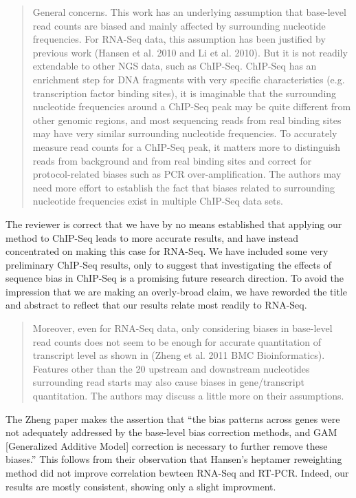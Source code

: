 \documentclass{article}
\begin{document}
\begin{quote}
General concerns. This work has an underlying assumption that base-level read
counts are biased and mainly affected by surrounding nucleotide frequencies.
For RNA-Seq data, this assumption has been justified by previous work (Hansen et
al. 2010 and Li et al. 2010). But it is not readily extendable to other NGS
data, such as ChIP-Seq. ChIP-Seq has an enrichment step for DNA fragments with
very specific characteristics (e.g. transcription factor binding sites), it is
imaginable that the surrounding nucleotide frequencies around a ChIP-Seq peak
may be quite different from other genomic regions, and most sequencing reads
from real binding sites may have very similar surrounding nucleotide
frequencies. To accurately measure read counts for a ChIP-Seq peak, it matters
more to distinguish reads from background and from real binding sites and
correct for protocol-related biases such as PCR over-amplification. The authors
may need more effort to establish the fact that biases related to surrounding
nucleotide frequencies exist in multiple ChIP-Seq data sets.
\end{quote}

The reviewer is correct that we have by no means established that applying our
method to ChIP-Seq leads to more accurate results, and have instead concentrated
on making this case for RNA-Seq. We have included some very preliminary ChIP-Seq
results, only to suggest that investigating the effects of sequence bias in
ChIP-Seq is a promising future research direction. To avoid the impression that
we are making an overly-broad claim, we have reworded the title and abstract to
reflect that our results relate most readily to RNA-Seq.


\begin{quote}
Moreover, even for RNA-Seq data, only considering biases in base-level read
counts does not seem to be enough for accurate quantitation of transcript level
as shown in (Zheng et al. 2011 BMC Bioinformatics). Features other than the 20
upstream and downstream nucleotides surrounding read starts may also cause
biases in gene/transcript quantitation. The authors may discuss a little more on
their assumptions.
\end{quote}

The Zheng paper makes the assertion that ``the bias patterns across genes were
not adequately addressed by the base-level bias correction methods, and GAM
[Generalized Additive Model] correction is necessary to further remove these
biases.'' This follows from their observation that Hansen's heptamer reweighting
method did not improve correlation bewteen RNA-Seq and RT-PCR. Indeed, our
results are mostly consistent, showing only a slight improvment.
\end{document}
